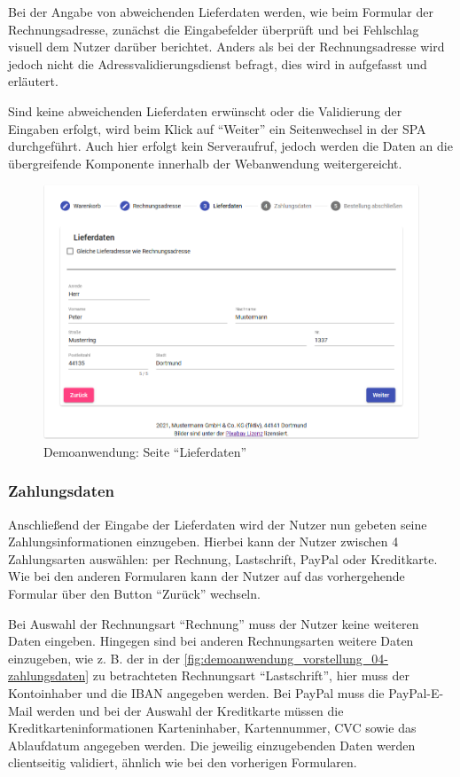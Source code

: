 Bei der Angabe von abweichenden Lieferdaten werden, wie beim Formular der Rechnungsadresse, zunächst die Eingabefelder überprüft und bei Fehlschlag visuell dem Nutzer darüber berichtet. Anders als bei der Rechnungsadresse wird jedoch nicht die Adressvalidierungsdienst befragt, dies wird in \label{sec:invalid-address-is-valid} aufgefasst und erläutert.

Sind keine abweichenden Lieferdaten erwünscht oder die Validierung der Eingaben erfolgt, wird beim Klick auf \enquote{Weiter} ein Seitenwechsel in der SPA durchgeführt. Auch hier erfolgt kein Serveraufruf, jedoch werden die Daten an die übergreifende Komponente innerhalb der Webanwendung weitergereicht.

\begin{figure}[H]
	\centering
	\includegraphics[width=1.00\linewidth]{img/04_erstellung-poc/demoanwendung_vorstellung_03-lieferdaten.png}
	\caption{Demoanwendung: Seite \enquote{Lieferdaten}}
	\label{fig:demoanwendung_vorstellung_03-lieferdaten}
\end{figure}

\subsubsection{Zahlungsdaten}

Anschließend der Eingabe der Lieferdaten wird der Nutzer nun gebeten seine Zahlungsinformationen einzugeben. Hierbei kann der Nutzer zwischen 4 Zahlungsarten auswählen: per Rechnung, Lastschrift, PayPal oder Kreditkarte. Wie bei den anderen Formularen kann der Nutzer auf das vorhergehende Formular über den Button \enquote{Zurück} wechseln.

Bei Auswahl der Rechnungsart \enquote{Rechnung} muss der Nutzer keine weiteren Daten eingeben. Hingegen sind bei anderen Rechnungsarten weitere Daten einzugeben, wie z. B. der in der \autoref{fig:demoanwendung_vorstellung_04-zahlungsdaten} zu betrachteten Rechnungsart \enquote{Lastschrift}, hier muss der Kontoinhaber und die IBAN angegeben werden. Bei PayPal muss die PayPal-E-Mail werden und bei der Auswahl der Kreditkarte müssen die Kreditkarteninformationen Karteninhaber, Kartennummer, CVC sowie das Ablaufdatum angegeben werden. Die jeweilig einzugebenden Daten werden clientseitig validiert, ähnlich wie bei den vorherigen Formularen.


